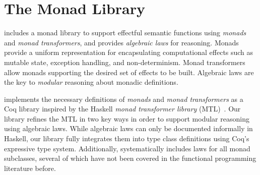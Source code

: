 \HaskellReset

\makeatother
\EndFmtInput































\section{The \name Monad Library}

\name includes a monad library to support effectful semantic
functions using \emph{monads} and \emph{monad transformers}, and
provides \emph{algebraic laws} for reasoning.
Monads provide a uniform representation for encapsulating
computational effects such as mutable state, exception handling, and
non-determinism. Monad transformers allow monads supporting the desired set of
effects to be built. Algebraic laws are the key to \emph{modular} reasoning about
monadic definitions.

\name implements the necessary definitions of \emph{monads} and
\emph{monad transformers} as a Coq library inspired by the Haskell
\emph{monad transformer library} (MTL)~\cite{liang95monad}. Our
library refines the MTL in two key ways in order to support modular
reasoning using algebraic laws. While algebraic laws can only be
documented informally in Haskell, our library fully integrates them
into type class definitions using Coq's expressive type
system. Additionally, \name systematically includes laws for all
monad subclasses, several of which have not been covered in the
functional programming literature before.

%


